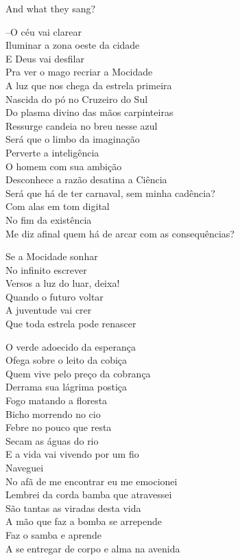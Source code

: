 \secdiv

And what they sang?

--O céu vai clarear \\
Iluminar a zona oeste da cidade \\
E Deus vai desfilar \\
Pra ver o mago recriar a Mocidade \\

A luz que nos chega da estrela primeira \\
Nascida do pó no Cruzeiro do Sul \\
Do plasma divino das mãos carpinteiras \\
Ressurge candeia no breu nesse azul \\
Será que o limbo da imaginação \\
Perverte a inteligência \\
O homem com sua ambição \\
Desconhece a razão desatina a Ciência \\
Será que há de ter carnaval, sem minha cadência? \\
Com alas em tom digital \\
No fim da existência \\
Me diz afinal quem há de arcar com as consequências?

Se a Mocidade sonhar \\
No infinito escrever \\
Versos a luz do luar, deixa! \\
Quando o futuro voltar \\
A juventude vai crer \\
Que toda estrela pode renascer

O verde adoecido da esperança \\
Ofega sobre o leito da cobiça \\
Quem vive pelo preço da cobrança \\
Derrama sua lágrima postiça \\
Fogo matando a floresta \\
Bicho morrendo no cio \\
Febre no pouco que resta \\
Secam as águas do rio \\
E a vida vai vivendo por um fio \\
Naveguei \\
No afã de me encontrar eu me emocionei \\
Lembrei da corda bamba que atravessei \\
São tantas as viradas desta vida \\
A mão que faz a bomba se arrepende \\
Faz o samba e aprende \\
A se entregar de corpo e alma na avenida
